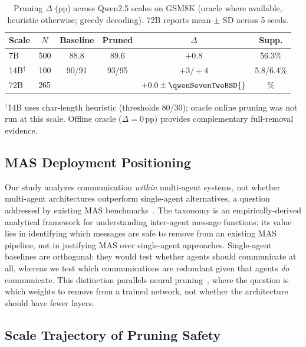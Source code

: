 \begin{table}[ht]
\centering
\caption{Pruning $\Delta$ (pp) across Qwen2.5 scales on GSM8K (oracle where available, heuristic otherwise; greedy decoding). 72B reports mean $\pm$ SD across 5 seeds.}
\label{app:tab:scale_summary}
\small
\begin{tabular}{lccccc}
\toprule
\textbf{Scale} & $N$ & \textbf{Baseline} & \textbf{Pruned} & $\Delta$ & \textbf{Supp.} \\
\midrule
7B  & 500 & 88.8 & 89.6 & $+0.8$ & 56.3\% \\
14B$^\dagger$ & 100 & 90/91 & 93/95 & $+3/+4$ & 5.8/6.4\% \\
72B & $265{}$ & \qwenSevenTwoBBaseline{} & \qwenSevenTwoBPruned{} & $\qwenSevenTwoBDelta{} \pm \qwenSevenTwoBSD{}$ & \qwenSevenTwoBSupp{}\% \\
\bottomrule
\end{tabular}

{\footnotesize $^\dagger$14B uses char-length heuristic (thresholds 80/30); oracle online pruning was not run at this scale. Offline oracle ($\Delta = 0$\,pp) provides complementary full-removal evidence.}
\end{table}

\subsection{MAS Deployment Positioning}

Our study analyzes communication \emph{within} multi-agent systems, not whether multi-agent architectures outperform single-agent alternatives, a question addressed by existing MAS benchmarks~\citep{du_protocolbench_2025, zhu_multiagentbench_2025}. The taxonomy is an empirically-derived analytical framework for understanding inter-agent message functions; its value lies in identifying which messages are safe to remove from an existing MAS pipeline, not in justifying MAS over single-agent approaches. Single-agent baselines are orthogonal: they would test whether agents should communicate at all, whereas we test which communications are redundant given that agents \emph{do} communicate. This distinction parallels neural pruning~\citep{lecun_obd_1990}, where the question is which weights to remove from a trained network, not whether the architecture should have fewer layers.

\subsection{Scale Trajectory of Pruning Safety}

